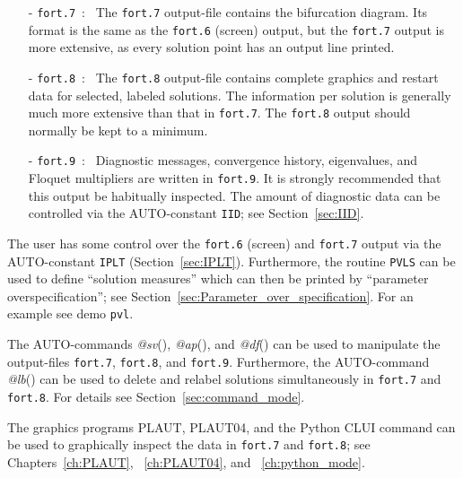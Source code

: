 \documentclass[12pt]{report}
\begin{document}
\begin{itemize}
\item[-] {\tt fort.7}~:~ 
  The {\tt fort.7} output-file contains the bifurcation diagram.
  Its format is the same as the {\tt fort.6} (screen) output, 
  but the {\tt fort.7} output is more extensive, as every solution point has 
  an output line printed.
\item[-] {\tt fort.8}~:~ 
  The {\tt fort.8} output-file contains complete graphics and restart data
  for selected, labeled solutions. 
  The information per solution is generally much more extensive than
  that in {\tt fort.7}. 
  The {\tt fort.8} output should normally be kept to a minimum.
\item[-] {\tt fort.9}~:~
  Diagnostic messages, convergence history, eigenvalues, and 
  Floquet multipliers are written in {\tt fort.9}.
  It is strongly recommended that this output be habitually inspected.
  The amount of diagnostic data can be controlled via the {\cal AUTO}-constant {\tt IID};
  see Section~\ref{sec:IID}.
\end{itemize}

The user has some control over the {\tt fort.6} (screen) and {\tt fort.7} output 
via the {\cal AUTO}-constant {\tt IPLT} (Section~\ref{sec:IPLT}).
Furthermore, the routine {\tt PVLS} can be used to define ``solution measures''
which can then be printed by ``parameter overspecification'';
see Section~\ref{sec:Parameter_over_specification}.
For an example see demo {\tt pvl}.

The {\cal AUTO}-commands {\it @sv}(), {\it @ap}(),
 and {\it @df}() can be used 
to manipulate  the output-files {\tt fort.7}, {\tt fort.8},
and {\tt fort.9}.
Furthermore, the {\cal AUTO}-command {\it @lb}() can be
used to delete and
relabel solutions simultaneously in {\tt fort.7} and {\tt fort.8}.
For details see Section~\ref{sec:command_mode}.

The graphics programs {\cal PLAUT}, {\cal PLAUT04}, and the Python
CLUI command  can be used to graphically inspect 
the data in {\tt fort.7} and {\tt fort.8}; see Chapters~\ref{ch:PLAUT},
~\ref{ch:PLAUT04}, and ~\ref{ch:python_mode}.
 
\end{document}
